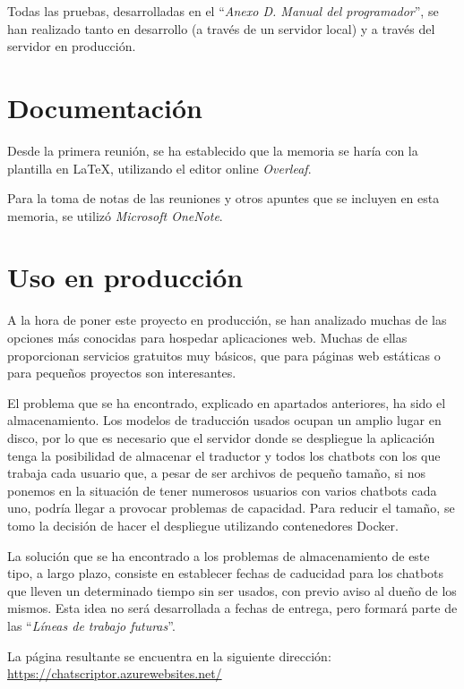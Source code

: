 Todas las pruebas, desarrolladas en el ``\textit{Anexo D. Manual del programador}'', se han realizado tanto en desarrollo (a través de un servidor local) y a través del servidor en producción.

\section{Documentación}
Desde la primera reunión, se ha establecido que la memoria se haría con la plantilla en \LaTeX, utilizando el editor online \textit{Overleaf}. 

Para la toma de notas de las reuniones y otros apuntes que se incluyen en esta memoria, se utilizó \textit{Microsoft OneNote}. 


\section{Uso en producción}
A la hora de poner este proyecto en producción, se han analizado muchas de las opciones más conocidas para hospedar aplicaciones web. Muchas de ellas proporcionan servicios gratuitos muy básicos, que para páginas web estáticas o para pequeños proyectos son interesantes.

El problema que se ha encontrado, explicado en apartados anteriores, ha sido el almacenamiento. Los modelos de traducción usados ocupan un amplio lugar en disco, por lo que es necesario que el servidor donde se despliegue la aplicación tenga la posibilidad de almacenar el traductor y todos los chatbots con los que trabaja cada usuario que, a pesar de ser archivos de pequeño tamaño, si nos ponemos en la situación de tener numerosos usuarios con varios chatbots cada uno, podría llegar a provocar problemas de capacidad. Para reducir el tamaño, se tomo la decisión de hacer el despliegue utilizando contenedores Docker.

La solución que se ha encontrado a los problemas de almacenamiento de este tipo, a largo plazo, consiste en establecer fechas de caducidad para los chatbots que lleven un determinado tiempo sin ser usados, con previo aviso al dueño de los mismos. Esta idea no será desarrollada a fechas de entrega, pero formará parte de las ``\textit{Líneas de trabajo futuras}''.

La página resultante se encuentra en la siguiente dirección: \url{https://chatscriptor.azurewebsites.net/}
